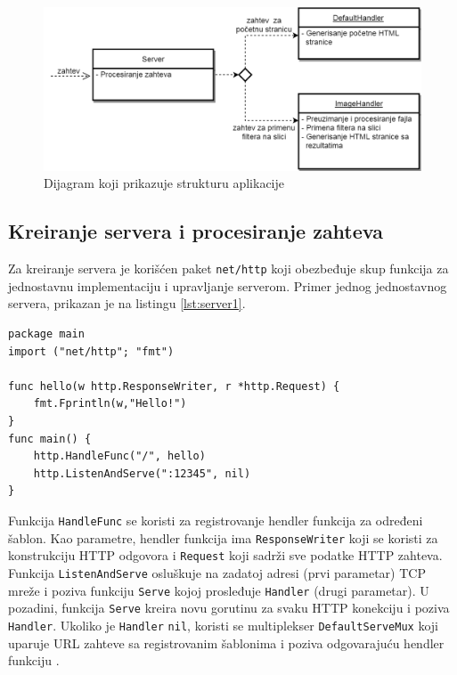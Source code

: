 \documentclass[12pt,oneside]{memoir}
\begin{document}
\begin{figure}
\begin{center}
\includegraphics[scale=0.45]{dijagram.png}
\end{center}
\caption{Dijagram koji prikazuje strukturu aplikacije}
\label{fig:diag}
\end{figure}

\subsection{Kreiranje servera i procesiranje zahteva}

Za kreiranje servera je korišćen paket \texttt{net/http} koji obezbeđuje skup funkcija za jednostavnu implementaciju i upravljanje serverom. Primer jednog jednostavnog servera, prikazan je na listingu \ref{lst:server1}. 

\begin{center}
\begin{lstlisting}[caption=Primer jednostavnog servera,label={lst:server1},   backgroundcolor=\color{background}]
package main
import ("net/http"; "fmt")

func hello(w http.ResponseWriter, r *http.Request) {
	fmt.Fprintln(w,"Hello!")
}
func main() {
	http.HandleFunc("/", hello)
	http.ListenAndServe(":12345", nil)
}
\end{lstlisting}
\end{center}


Funkcija \texttt{HandleFunc} se koristi za registrovanje hendler funkcija za određeni šablon. Kao parametre, hendler funkcija ima \texttt{ResponseWriter} koji se koristi za konstrukciju HTTP odgovora i \texttt{Request} koji sadrži sve podatke HTTP zahteva. Funkcija \texttt{ListenAndServe} osluškuje na zadatoj adresi (prvi parametar) TCP mreže i poziva funkciju \texttt{Serve} kojoj prosleđuje \texttt{Handler} (drugi parametar). U pozadini, funkcija \texttt{Serve} kreira novu gorutinu za svaku HTTP konekciju i poziva \texttt{Handler}. Ukoliko je \texttt{Handler} \texttt{nil}, koristi se multiplekser \texttt{DefaultServeMux} koji uparuje URL zahteve sa registrovanim šablonima i poziva odgovarajuću hendler funkciju \cite{http}.
\end{document}
